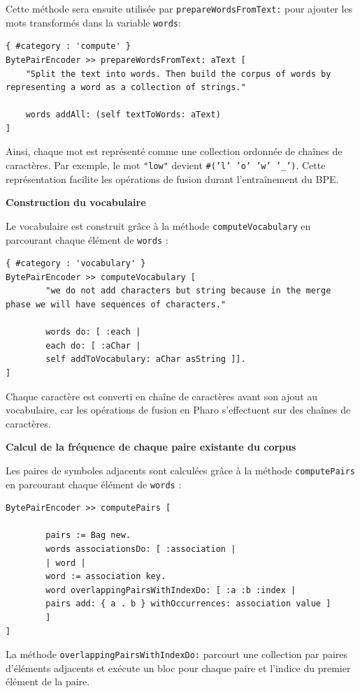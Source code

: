 \documentclass[12pt,a4paper]{report}
\begin{document}
Cette méthode sera ensuite utilisée par \texttt{prepareWordsFromText:} pour ajouter les mots transformés dans la variable \texttt{words}:

\begin{verbatim}
{ #category : 'compute' }
BytePairEncoder >> prepareWordsFromText: aText [
	"Split the text into words. Then build the corpus of words by representing a word as a collection of strings."
	
	words addAll: (self textToWords: aText)
]
\end{verbatim}

Ainsi, chaque mot est représenté comme une collection ordonnée de chaînes de caractères. Par exemple, le mot \texttt{"low"} devient \texttt{\#('l' 'o' 'w' '\_')}. Cette représentation facilite les opérations de fusion durant l’entraînement du BPE.

\textbf{Construction du vocabulaire}

Le vocabulaire est construit grâce à la méthode \texttt{computeVocabulary} en parcourant chaque élément de \texttt{words} :

\begin{verbatim}
{ #category : 'vocabulary' }
BytePairEncoder >> computeVocabulary [
		"we do not add characters but string because in the merge phase we will have sequences of characters."
		
		words do: [ :each | 
		each do: [ :aChar | 
		self addToVocabulary: aChar asString ]].
]
\end{verbatim}
Chaque caractère est converti en chaîne de caractères avant son ajout au vocabulaire, car les opérations de fusion en Pharo s’effectuent sur des chaînes de caractères.

\textbf{Calcul de la fréquence de chaque paire existante du corpus}

Les paires de symboles adjacents sont calculées grâce à la méthode \texttt{computePairs} en parcourant chaque élément de \texttt{words} :

\begin{verbatim}
BytePairEncoder >> computePairs [

		pairs := Bag new.
		words associationsDo: [ :association | 
		| word |
		word := association key.
		word overlappingPairsWithIndexDo: [ :a :b :index | 
		pairs add: { a . b } withOccurrences: association value ]
		]
]
\end{verbatim}

La méthode \texttt{overlappingPairsWithIndexDo:} parcourt une collection par paires d’éléments adjacents et exécute un bloc pour chaque paire et l'indice du premier élément de la paire.
\end{document}
